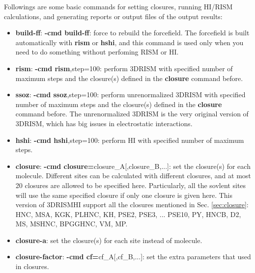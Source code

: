 \documentclass[aip,amsmath,amssymb,reprint,onecolumn]{revtex4-1}
\begin{document}
Followings are some basic commands for setting closures, running HI/RISM calculations, and generating reports or output files of the output results:

\begin{itemize}
    \item {\bf build-ff}: {\bf -cmd build-ff}: force to rebuild the forcefield. The forcefield is built automatically with {\bf rism} or {\bf hshi}, and this command is used only when you need to do something without perfoming RISM or HI.

    \item {\bf rism}: {\bf -cmd rism},step=100: perform 3DRISM with specified number of maximum steps and the closure(s) defined in the {\bf closure} command before.
    \item {\bf ssoz}: {\bf -cmd ssoz},step=100: perform unrenormalized 3DRISM with specified number of maximum steps and the closure(s) defined in the {\bf closure} command before. The unrenormalized 3DRISM is the very original version of 3DRISM, which has big issues in electrostatic interactions.
    \item {\bf hshi}: {\bf -cmd hshi},step=100: perform HI with specified number of maximum steps.

    \item {\bf closure}: {\bf -cmd closure=}closure\_A[,closure\_B,...]: set the closure(s) for each molecule. Different sites can be calculated with different closures, and at most 20 closures are allowed to be specified here. Particularly, all the sovlent sites will use the same specified closure if only one closure is given here. This version of 3DRISMHI support all the closures mentioned in Sec. \ref{sec:closure}: HNC, MSA, KGK, PLHNC, KH, PSE2, PSE3, ... PSE10, PY, HNCB, D2, MS, MSHNC, BPGGHNC, VM, MP.
    \item {\bf closure-a}: set the closure(s) for each site instead of molecule.
    \item {\bf closure-factor}: {\bf -cmd cf=}cf\_A[,cf\_B,...]: set the extra parameters that used in closures.


\end{itemize}
\end{document}
